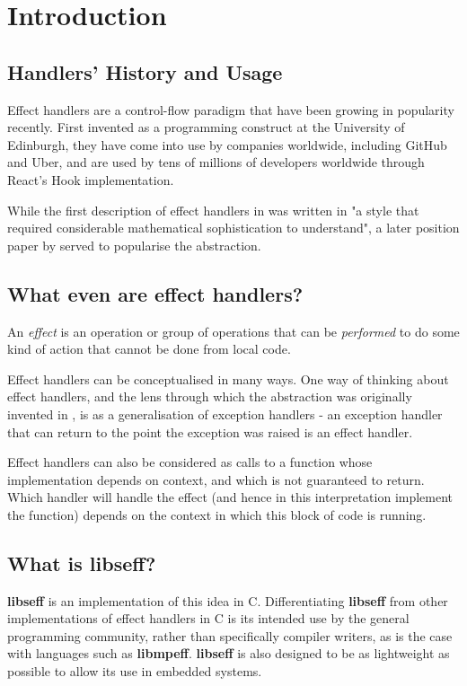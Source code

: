 \documentclass[logo,bsc,singlespacing,parskip,online]{infthesis}
\begin{document}
\chapter{Introduction}

\section{Handlers' History and Usage}
Effect handlers are a control-flow paradigm that have been growing in popularity recently. \citep{effekt-paper} First invented as a programming construct at the University of Edinburgh, they have come into use by companies worldwide, including GitHub and Uber, and are used by tens of millions of developers worldwide through React's Hook implementation. \citep{impact_study}

While the first description of effect handlers in \citet{og-paper} was written in "a style that required
considerable mathematical sophistication to understand", \citep{impact_study} a later position paper by \citeauthor{action-position-paper} served to popularise the abstraction.

\section{What even are effect handlers?}
An \textit{effect} is an operation or group of operations that can be \textit{performed} to do some kind of action that cannot be done from local code. 

Effect handlers can be conceptualised in many ways. One way of thinking about effect handlers, and the lens through which the abstraction was originally invented in \cite{og-paper}, is as a generalisation of exception handlers - an exception handler that can return to the point the exception was raised is an effect handler. \citep{ocaml-paper}

Effect handlers can also be considered as calls to a function whose implementation depends on context, and which is not guaranteed to return. Which handler will handle the effect (and hence in this interpretation implement the function) depends on the context in which this block of code is running. \citep{award-paper}

\section{What is libseff?}

\textbf{libseff} is an implementation of this idea in C. Differentiating \textbf{libseff} from other implementations of effect handlers in C is its intended use by the general programming community, rather than specifically compiler writers, as is the case with languages such as \textbf{libmpeff}. \citep{libseff_paper} \citep{libmprompt} \textbf{libseff} is also designed to be as lightweight as possible to allow its use in embedded systems. \citep{libseff_paper}
\end{document}
